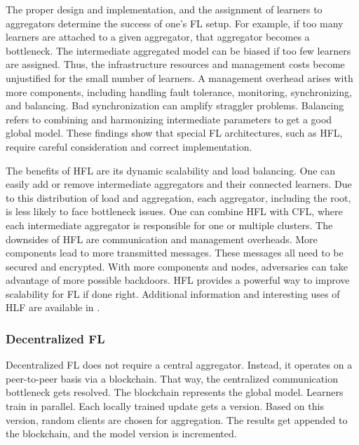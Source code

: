 The proper design and implementation, and the assignment of learners to aggregators determine the success of one's FL setup.
For example, if too many learners are attached to a given aggregator, that aggregator becomes a bottleneck.
The intermediate aggregated model can be biased if too few learners are assigned.
Thus, the infrastructure resources and management costs become unjustified for the small number of learners.
A management overhead arises with more components, including handling fault tolerance, monitoring, synchronizing, and balancing.
Bad synchronization can amplify straggler problems.
Balancing refers to combining and harmonizing intermediate parameters to get a good global model.
These findings show that special FL architectures, such as HFL, require careful consideration and correct implementation.

The benefits of HFL are its dynamic scalability and load balancing.
One can easily add or remove intermediate aggregators and their connected learners.
Due to this distribution of load and aggregation, each aggregator, including the root, is less likely to face bottleneck issues.
One can combine HFL with CFL, where each intermediate aggregator is responsible for one or multiple clusters.
The downsides of HFL are communication and management overheads.
More components lead to more transmitted messages.
These messages all need to be secured and encrypted.
With more components and nodes, adversaries can take advantage of more possible backdoors.
HFL provides a powerful way to improve scalability for FL if done right.
Additional information and interesting uses of HLF are available in \cite{
    paper:deploying_fl_in_hierarchical_edge_architecture,
    paper:hfl_with_momentum_acceleration_in_multi_tier_networks,
    paper:hfl_with_privacy,
    paper:decentralized_edge_intelligence_dynamic_resource_allocation_framework_hfl,
    book:fl,
    hpfl_over_massive_mobile_edge_computing_networks}.


\subsubsection{Decentralized FL}
Decentralized FL does not require a central aggregator.
Instead, it operates on a peer-to-peer basis via a blockchain.
That way, the centralized communication bottleneck gets resolved.
The blockchain represents the global model.
Learners train in parallel.
Each locally trained update gets a version.
Based on this version, random clients are chosen for aggregation.
The results get appended to the blockchain, and the model version is incremented. \cite{book:fl}

